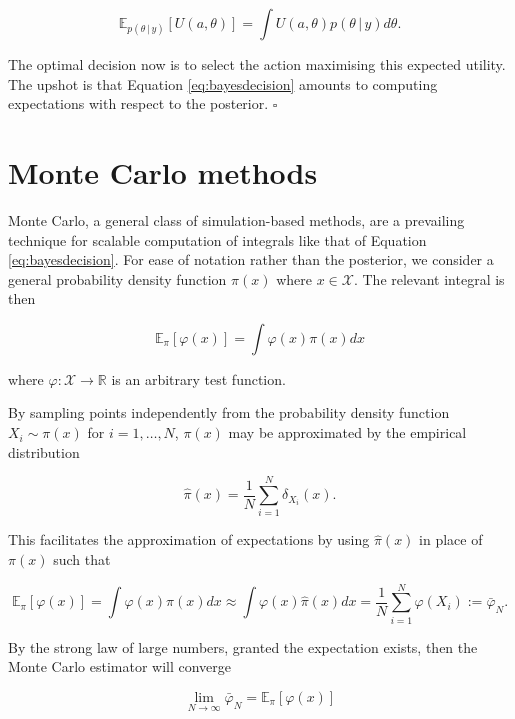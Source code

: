 \documentclass[11pt,]{book}
\begin{document}
\begin{equation}
\mathbb{E}_{p(\theta \, | \, y)}[U(a, \theta)] = \int U(a, \theta) p(\theta \, | \, y) d\theta. \label{eq:bayesdecision}
\end{equation}

The optimal decision now is to select the action maximising this
expected utility. The upshot is that Equation \eqref{eq:bayesdecision}
amounts to computing expectations with respect to the posterior.
\hfill \(\square\)

\section{Monte Carlo methods}\label{monte-carlo-methods}

Monte Carlo, a general class of simulation-based methods, are a
prevailing technique for scalable computation of integrals like that of
Equation \eqref{eq:bayesdecision}. For ease of notation rather than the
posterior, we consider a general probability density function \(\pi(x)\)
where \(x \in \mathcal{X}\). The relevant integral is then

\begin{equation}
\mathbb{E}_\pi[\varphi(x)] = \int \varphi(x) \pi(x) dx
\end{equation}

where \(\varphi: \mathcal{X} \to \mathbb{R}\) is an arbitrary test
function.

By sampling points independently from the probability density function
\(X_i \sim \pi(x)\) for \(i = 1,\ldots, N\), \(\pi(x)\) may be
approximated by the empirical distribution

\begin{equation}
\widehat{\pi}(x) = \frac{1}{N} \sum_{i=1}^{N} \delta_{X_i}(x). \label{eq:empirical}
\end{equation}

This facilitates the approximation of expectations by using
\(\widehat{\pi}(x)\) in place of \(\pi(x)\) such that

\begin{equation}
\mathbb{E}_\pi[\varphi(x)] = \int \varphi(x) \pi(x) dx \approx \int \varphi(x) \widehat{\pi}(x) dx = \frac{1}{N} \sum_{i=1}^{N} \varphi(X_i) := \bar \varphi_N. \label{eq:monte}
\end{equation}

By the strong law of large numbers, granted the expectation exists, then
the Monte Carlo estimator will converge

\begin{equation}
\lim_{N\to\infty} \bar \varphi_N = \mathbb{E}_\pi[\varphi(x)] 
\end{equation}
\end{document}
